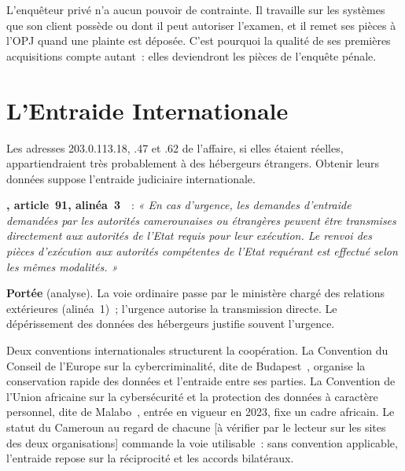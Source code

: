 L'enquêteur privé n'a aucun pouvoir de contrainte. Il travaille sur les
systèmes que son client possède ou dont il peut autoriser l'examen, et il
remet ses pièces à l'OPJ quand une plainte est déposée. C'est pourquoi la
qualité de ses premières acquisitions compte autant~: elles deviendront les
pièces de l'enquête pénale.

\section{L'Entraide Internationale}
\label{sec:c08-entraide}

Les adresses 203.0.113.18, .47 et .62 de l'affaire, si elles étaient
réelles, appartiendraient très probablement à des hébergeurs étrangers.
Obtenir leurs données suppose l'entraide judiciaire internationale.

\begin{boxjuris}
\textbf{, article~91, alinéa~3}~\cite{loi2010012}~:
\textit{« En cas d'urgence, les demandes d'entraide demandées par les
autorités camerounaises ou étrangères peuvent être transmises directement
aux autorités de l'Etat requis pour leur exécution. Le renvoi des pièces
d'exécution aux autorités compétentes de l'Etat requérant est effectué selon
les mêmes modalités. »}

\medskip
\textbf{Portée} (analyse). La voie ordinaire passe par le ministère chargé
des relations extérieures (alinéa~1)~; l'urgence autorise la transmission
directe. Le dépérissement des données des hébergeurs justifie souvent
l'urgence.
\end{boxjuris}

Deux conventions internationales structurent la coopération. La Convention
du Conseil de l'Europe sur la cybercriminalité, dite de
Budapest~\cite{budapest2001}, organise la conservation rapide des données et
l'entraide entre ses parties. La Convention de l'Union africaine sur la
cybersécurité et la protection des données à caractère personnel, dite de
Malabo~\cite{ua2014malabo}, entrée en vigueur en 2023, fixe un cadre
africain. Le statut du Cameroun au regard de chacune [à vérifier par le
lecteur sur les sites des deux organisations] commande la voie utilisable~:
sans convention applicable, l'entraide repose sur la réciprocité et les
accords bilatéraux.

